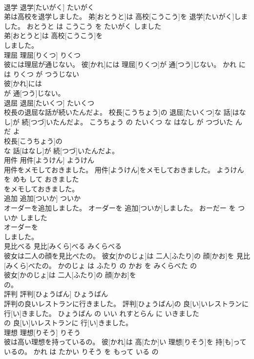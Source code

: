 \documentclass[8pt]{extreport}
\begin{document}
\begin{CJK}{UTF8}{min}
\\	退学	退学[たいがく]	たいがく	
\\	弟は高校を退学しました。	弟[おとうと]は 高校[こうこう]を 退学[たいがく]しました。	おとうと は こうこう を たいがく しました	
\\	弟[おとうと]は 高校[こうこう]を
\\	しました。			
\\	理屈	理屈[りくつ]	りくつ	
\\	彼には理屈が通じない。	彼[かれ]には 理屈[りくつ]が 通[つう]じない。	かれ に は りくつ が つうじない	
\\	彼[かれ]には
\\	が 通[つう]じない。			
\\	退屈	退屈[たいくつ]	たいくつ	
\\	校長の退屈な話が続いたんだよ。	校長[こうちょう]の 退屈[たいくつ]な 話[はなし]が 続[つづ]いたんだよ。	こうちょう の たいくつ な はなし が つづいた ん だ よ	
\\	校長[こうちょう]の
\\	な 話[はなし]が 続[つづ]いたんだよ。			
\\	用件	用件[ようけん]	ようけん	
\\	用件をメモしておきました。	用件[ようけん]をメモしておきました。	ようけん を めも して おきました	
\\	をメモしておきました。			
\\	追加	追加[ついか]	ついか	
\\	オーダーを追加しました。	オーダーを 追加[ついか]しました。	おーだー を ついか しました	
\\	オーダーを
\\	しました。			
\\	見比べる	見比[みくら]べる	みくらべる	
\\	彼女は二人の顔を見比べたの。	彼女[かのじょ]は 二人[ふたり]の 顔[かお]を 見比[みくら]べたの。	かのじょ は ふたり の かお を みくらべた の	
\\	彼女[かのじょ]は 二人[ふたり]の 顔[かお]を
\\	の。			
\\	評判	評判[ひょうばん]	ひょうばん	
\\	評判の良いレストランに行きました。	評判[ひょうばん]の 良[い]いレストランに 行[い]きました。	ひょうばん の いい れすとらん に いきました	
\\	の 良[い]いレストランに 行[い]きました。			
\\	理想	理想[りそう]	りそう	
\\	彼は高い理想を持っているの。	彼[かれ]は 高[たか]い 理想[りそう]を 持[も]っているの。	かれ は たかい りそう を もって いる の	

\end{CJK}
\end{document}

